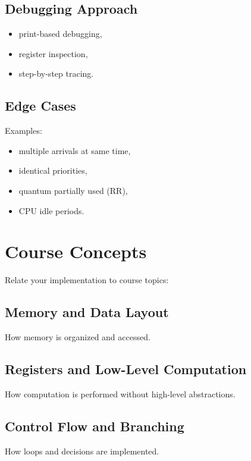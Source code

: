 \documentclass[a4paper,12pt]{article}
\begin{document}
\subsection{Debugging Approach}

\begin{itemize}
\item print-based debugging,
\item register inspection,
\item step-by-step tracing.
\end{itemize}

\subsection{Edge Cases}

Examples:

\begin{itemize}
\item multiple arrivals at same time,
\item identical priorities,
\item quantum partially used (RR),
\item CPU idle periods.
\end{itemize}

\section{Course Concepts}

Relate your implementation to course topics:

\subsection{Memory and Data Layout}

How memory is organized and accessed.

\subsection{Registers and Low-Level Computation}

How computation is performed without high-level abstractions.

\subsection{Control Flow and Branching}

How loops and decisions are implemented.
\end{document}
